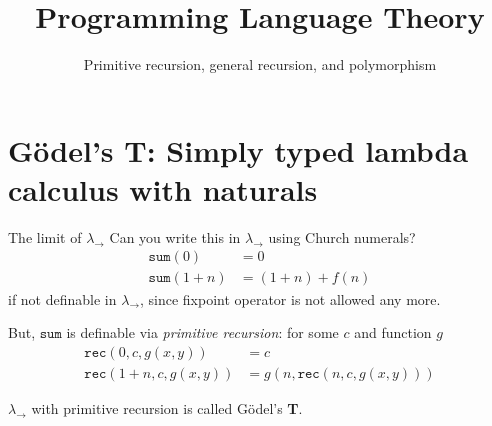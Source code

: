 
\usepackage{listings}
\title{Programming Language Theory}
\subtitle{Primitive recursion, general recursion, and polymorphism}

\begin{frame}
\maketitle
\end{frame}

%

\section{G\"odel's \textbf{T}: Simply typed lambda calculus with naturals}
\begin{frame}{The limit of $\lambda_\to$}
  Can you write this in $\lambda_\to$ using Church numerals?
  \begin{align*}
    \mathtt{sum}(0)     & = 0 \\
    \mathtt{sum}(1 + n) & = (1 + n) + f(n)
  \end{align*}
  if not definable in $\lambda_\to$, since fixpoint operator is not allowed any more. 

  But, $\mathtt{sum}$ is definable via \emph{primitive recursion}:
  for some $c$ and function $g$
  \begin{align*}
    \mathtt{rec}(0, c, g(x, y))       &= c \\
    \mathtt{rec}(1 + n, c, g(x, y))   &= g(n, \mathtt{rec}(n, c, g(x, y)))
  \end{align*}

  $\lambda_\to$ with primitive recursion is called G\"odel's \textbf{T}.
\end{frame}

